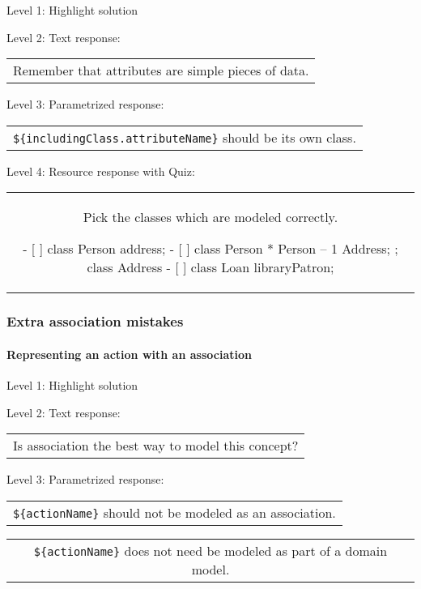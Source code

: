 \noindent Level 1: Highlight solution \medskip

\noindent Level 2: Text response: \medskip

\begin{tabular}{|c}
Remember that attributes are simple pieces of data.
\end{tabular} \medskip

\noindent Level 3: Parametrized response: \medskip

\begin{tabular}{|c}
\verb|${includingClass.attributeName}| should be its own class.
\end{tabular} \medskip

\noindent Level 4: Resource response with Quiz:

\begin{tabular}{|c}
Pick the classes which are modeled correctly.

- [ ] class Person { address; }
- [ ] class Person { * Person -- 1 Address; }; class Address {}
- [ ] class Loan { libraryPatron; }
\end{tabular} \medskip


\subsubsection{Extra association mistakes}

\paragraph{Representing an action with an association}

\noindent Level 1: Highlight solution \medskip

\noindent Level 2: Text response: \medskip

\begin{tabular}{|c}
Is association the best way to model this concept?
\end{tabular} \medskip

\noindent Level 3: Parametrized response: \medskip

\begin{tabular}{|c}
\verb|${actionName}| should not be modeled as an association.
\end{tabular} \medskip

\begin{tabular}{|c}
\verb|${actionName}| does not need be modeled as part of a domain model.
\end{tabular} \medskip

